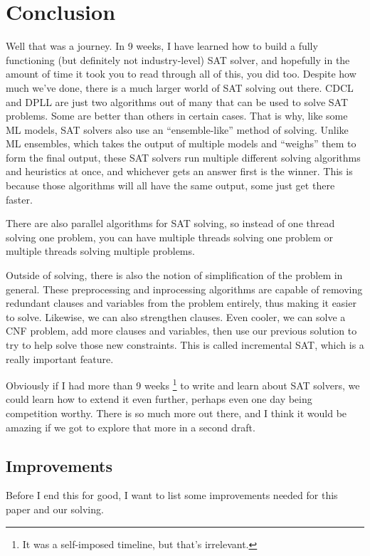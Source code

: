 \documentclass[oneside]{book}
\begin{document}
\chapter{Conclusion}

Well that was a journey. In 9 weeks, I have learned how to build a fully functioning 
(but definitely not industry-level) SAT solver, and hopefully in the amount of time it 
took you to read through all of this, you did too. Despite how much we've done, there is 
a much larger world of SAT solving out there. CDCL and DPLL are just two algorithms out 
of many that can be used to solve SAT problems. Some are better than others in certain 
cases. That is why, like some ML models, SAT solvers also use an ``ensemble-like'' method 
of solving. Unlike ML ensembles, which takes the output of multiple models and ``weighs''
them to form the final output, these SAT solvers run multiple different solving 
algorithms and heuristics at once, and whichever gets an answer first is the winner. 
This is because those algorithms will all have the same output, some just get there 
faster.

There are also parallel algorithms for SAT solving, so instead of one thread solving 
one problem, you can have multiple threads solving one problem or multiple threads solving 
multiple problems. 

Outside of solving, there is also the notion of simplification of the problem in general. 
These preprocessing and inprocessing algorithms are capable of removing redundant clauses 
and variables from the problem entirely, thus making it easier to solve. Likewise, we can 
also strengthen clauses. Even cooler, we can solve a CNF problem, add more clauses and variables,
then use our previous solution to try to help solve those new constraints. This is called 
incremental SAT, which is a really important feature.

Obviously if I had more than 9 weeks
\footnote{It was a self-imposed timeline, but that's irrelevant.}
to write and learn about SAT solvers, we could learn how to extend it even further, 
perhaps even one day being competition worthy. There is so much more out there, and I 
think it would be amazing if we got to explore that more in a second draft.

\section{Improvements}

Before I end this for good, I want to list some improvements needed for this paper
and our solving.
\end{document}
